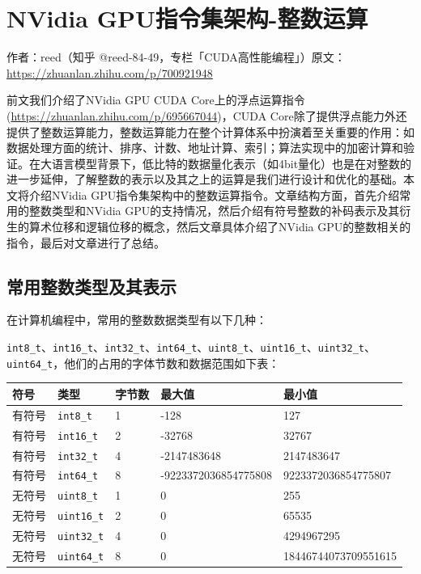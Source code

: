 \chapter{NVidia GPU指令集架构-整数运算}

\begin{center}\small 作者：reed（知乎 @reed-84-49，专栏「CUDA高性能编程」）\quad 原文：\url{https://zhuanlan.zhihu.com/p/700921948}\end{center}

前文我们介绍了NVidia GPU CUDA Core上的浮点运算指令(\url{https://zhuanlan.zhihu.com/p/695667044})，CUDA Core除了提供浮点能力外还提供了整数运算能力，整数运算能力在整个计算体系中扮演着至关重要的作用：如数据处理方面的统计、排序、计数、地址计算、索引；算法实现中的加密计算和验证。在大语言模型背景下，低比特的数据量化表示（如4bit量化）也是在对整数的进一步延伸，了解整数的表示以及其之上的运算是我们进行设计和优化的基础。本文将介绍NVidia GPU指令集架构中的整数运算指令。文章结构方面，首先介绍常用的整数类型和NVidia GPU的支持情况，然后介绍有符号整数的补码表示及其衍生的算术位移和逻辑位移的概念，然后文章具体介绍了NVidia GPU的整数相关的指令，最后对文章进行了总结。

\section{常用整数类型及其表示}

在计算机编程中，常用的整数数据类型有以下几种：

\lstinline|int8_t|、\lstinline|int16_t|、\lstinline|int32_t|、\lstinline|int64_t|、\lstinline|uint8_t|、\lstinline|uint16_t|、\lstinline|uint32_t|、\lstinline|uint64_t|，他们的占用的字体节数和数据范围如下表：

\begin{table}[htbp]\centering
\begin{tabular}{lllll}
\toprule
符号 & 类型 & 字节数 & 最大值 & 最小值 \\
\midrule
有符号 & \texttt{int8\_t} & 1 & -128 & 127 \\
有符号 & \texttt{int16\_t} & 2 & -32768 & 32767 \\
有符号 & \texttt{int32\_t} & 4 & -2147483648 & 2147483647 \\
有符号 & \texttt{int64\_t} & 8 & -9223372036854775808 & 9223372036854775807 \\
无符号 & \texttt{uint8\_t} & 1 & 0 & 255 \\
无符号 & \texttt{uint16\_t} & 2 & 0 & 65535 \\
无符号 & \texttt{uint32\_t} & 4 & 0 & 4294967295 \\
无符号 & \texttt{uint64\_t} & 8 & 0 & 18446744073709551615 \\
\bottomrule
\end{tabular}
\end{table}

